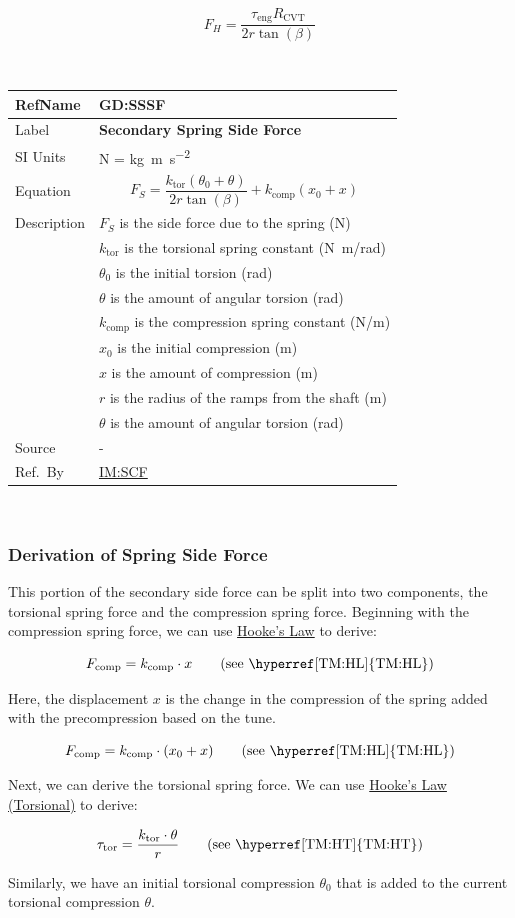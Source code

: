 \documentclass[12pt]{article}
\newcommand{\colAwidth}{0.13\textwidth}
\newcommand{\colBwidth}{0.82\textwidth}
\newcommand{\hpref}[1]{\hyperref[#1]{#1}}
\newcommand{\defgeneral}[7] {
~\newline
\noindent
\begin{minipage}{\textwidth}
\renewcommand*{\arraystretch}{1.5}
\begin{tabular}{| p{\colAwidth} | p{\colBwidth}|}
  \hline
  \rowcolor[gray]{0.9}
  RefName& \textbf{#1} \label{#1}\\
  \hline
  Label& \bf #2 \\
  \hline
  SI Units& #3\\
  \hline
  Equation& #4\\
  \hline
  Description& #5 \\
  \hline
  Source& #6 \\
  \hline
  Ref.\ By & #7\\
  \hline
\end{tabular}
\end{minipage}\\
}
\begin{document}
\[ F_H = \frac{\tau_\text{eng} R_{\text{CVT}}}{2r\tan(\beta)} \]


\defgeneral
{GD:SSSF}
{Secondary Spring Side Force} %
{N = \si{\kilogram \metre\per\square\second}} %
{\[F_S = \frac{k_{\text{tor}}(\theta_0 + \theta)}{2r\tan(\beta)} + k_\text{comp}(x_0 + x)\]} %
{$F_S$ is the side force due to the spring (N) \\
& $k_{\text{tor}}$ is the torsional spring constant (\si[per-mode=symbol] {\newton\metre\per\radian}) \\
& $\theta_0$ is the initial torsion (rad) \\
& $\theta$ is the amount of angular torsion (rad) \\
& $k_{\text{comp}}$ is the compression spring constant (\si[per-mode=symbol] {\newton\per\metre}) \\
& $x_0$ is the initial compression (m) \\
& $x$ is the amount of compression (m) \\
& $r$ is the radius of the ramps from the shaft (m) \\
& $\theta$ is the amount of angular torsion (rad)} %
{-} %
{\hpref{IM:SCF}} %

\subsubsection*{Derivation of Spring Side Force}

This portion of the secondary side force can be split into two components, the torsional spring force and the compression spring force. 
Beginning with the compression spring force, we can use \hyperref[TM:HL]{Hooke's Law} to derive:

\[ F_{\text{comp}} = k_{\text{comp}} \cdot x \tag*{\text{(see \hyperref[TM:HL]{TM:HL})}}\]

Here, the displacement $x$ is the change in the compression of the spring added with the precompression based on the tune.

\[ F_{\text{comp}} = k_{\text{comp}} \cdot (x_0 + x) \tag*{\text{(see \hyperref[TM:HL]{TM:HL})}}\]

Next, we can derive the torsional spring force. We can use \hyperref[TM:HT]{Hooke's Law (Torsional)} to derive:

\[ \tau_{\text{tor}} = \frac{k_{\text{tor}} \cdot \theta}{r} \tag*{\text{(see \hyperref[TM:HT]{TM:HT})}}\]

Similarly, we have an initial torsional compression $\theta_0$ that is added to the current torsional compression $\theta$.
\end{document}
